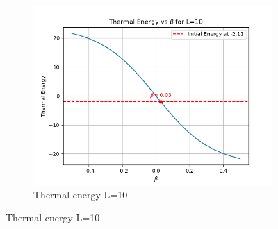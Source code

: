 \documentclass[12pt]{article}
\begin{document}
\begin{figure}[htbp]
\begin{subfigure}[b]{0.32\textwidth}
        \includegraphics[width=\textwidth]{p4_3_1_thermal_energy_intersection_L10.png}
        \caption{Thermal energy L=10}
    \end{subfigure}


\end{figure}
\end{document}
